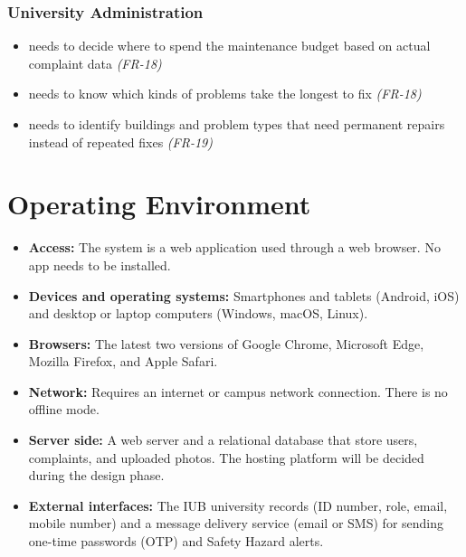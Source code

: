 \subsubsection*{University Administration}

\begin{itemize}
  \item needs to decide where to spend the maintenance budget based on actual complaint data \textit{(FR-18)}
  \item needs to know which kinds of problems take the longest to fix \textit{(FR-18)}
  \item needs to identify buildings and problem types that need permanent repairs instead of repeated fixes \textit{(FR-19)}
\end{itemize}

\section{Operating Environment}
\begin{itemize}
  \item \textbf{Access:} The system is a web application used through a web browser. No app needs to be installed.
  \item \textbf{Devices and operating systems:} Smartphones and tablets (Android, iOS) and desktop or laptop computers (Windows, macOS, Linux).
  \item \textbf{Browsers:} The latest two versions of Google Chrome, Microsoft Edge, Mozilla Firefox, and Apple Safari.
  \item \textbf{Network:} Requires an internet or campus network connection. There is no offline mode.
  \item \textbf{Server side:} A web server and a relational database that store users, complaints, and uploaded photos. The hosting platform will be decided during the design phase.
  \item \textbf{External interfaces:} The IUB university records (ID number, role, email, mobile number) and a message delivery service (email or SMS) for sending one-time passwords (OTP) and Safety Hazard alerts.
\end{itemize}

